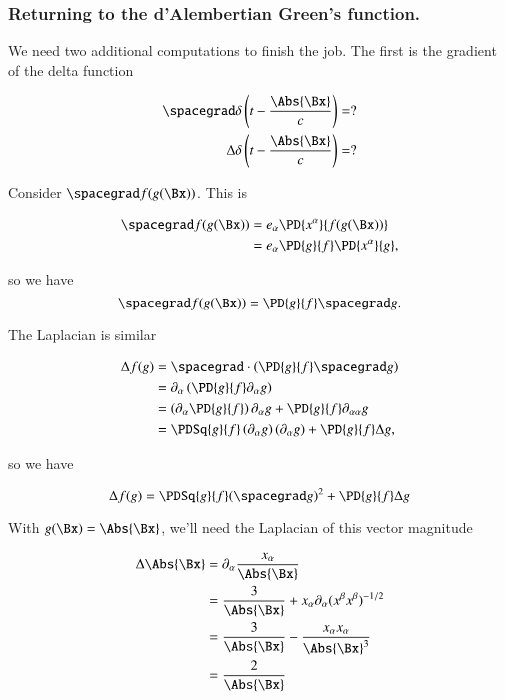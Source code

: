 \subsubsection{Returning to the d'Alembertian Green's function.}

We need two additional computations to finish the job.  The first is the gradient of the delta function

\begin{align*}
\spacegrad \delta\left(t - \frac{\Abs{\Bx}}{c}\right) &= ? \\
\Delta \delta\left(t - \frac{\Abs{\Bx}}{c}\right) &= ?
\end{align*}

Consider $\spacegrad f(g(\Bx))$.  This is

\begin{align*}
\spacegrad f(g(\Bx))
&=
e_\alpha \PD{x^\alpha}{f(g(\Bx))} \\
&=
e_\alpha \PD{g}{f} \PD{x^\alpha}{g},
\end{align*}

so we have
\begin{equation}\label{eqn:relativisticElectrodynamicsL18:400}
\spacegrad f(g(\Bx))
=
\PD{g}{f} \spacegrad g.
\end{equation}

The Laplacian is similar

\begin{align*}
\Delta f(g)
&= 
\spacegrad \cdot \left(\PD{g}{f} \spacegrad g \right) \\
&= 
\partial_\alpha \left(\PD{g}{f} \partial_\alpha g \right) \\
&= 
\left( \partial_\alpha \PD{g}{f} \right) \partial_\alpha g 
+\PD{g}{f} \partial_{\alpha\alpha} g  \\
&= 
\PDSq{g}{f} \left( \partial_\alpha g \right) (\partial_\alpha g)
+\PD{g}{f} \Delta g,
\end{align*}

so we have

\begin{equation}\label{eqn:relativisticElectrodynamicsL18:420}
\Delta f(g)
= 
\PDSq{g}{f} (\spacegrad g)^2 +\PD{g}{f} \Delta g
\end{equation}

With $g(\Bx) = \Abs{\Bx}$, we'll need the Laplacian of this vector magnitude

\begin{align*}
\Delta \Abs{\Bx}
&=
\partial_\alpha \frac{x_\alpha}{\Abs{\Bx}} \\
&=
\frac{3}{\Abs{\Bx}} 
+ x_\alpha \partial_\alpha (x^\beta x^\beta)^{-1/2} \\
&=
\frac{3}{\Abs{\Bx}} 
- \frac{x_\alpha x_\alpha}{\Abs{\Bx}^3} \\
&= \frac{2}{\Abs{\Bx}} 
\end{align*}

